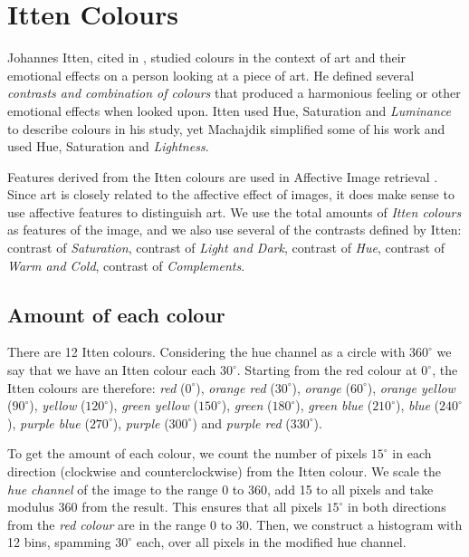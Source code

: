 \documentclass[11pt,a4paper,twoside,openright]{report}
\begin{document}
\section{Itten Colours}

Johannes Itten, cited in \cite{mach10clas}, studied colours in the context of
art and their emotional effects on a person looking at a piece of art.  He
defined several \emph{contrasts and combination of colours} that produced a
harmonious feeling or other emotional effects when looked upon.  Itten used
Hue, Saturation and \emph{Luminance} to describe colours in his study, yet
Machajdik \cite{mach10clas} simplified some of his work and used Hue,
Saturation and \emph{Lightness}.

Features derived from the Itten colours are used in Affective Image retrieval
\cite{mach10clas}.  Since art is closely related to the affective effect of
images, it does make sense to use affective features to distinguish art.  We
use the total amounts of \emph{Itten colours} as features of the image, and we
also use several of the contrasts defined by Itten: contrast of
\emph{Saturation}, contrast of \emph{Light and Dark}, contrast of \emph{Hue},
contrast of \emph{Warm and Cold}, contrast of \emph{Complements}.

\subsection{Amount of each colour}

There are 12 Itten colours.  Considering the hue channel as a circle
with $360^{\circ}$ we say that we have an Itten colour each $30^{\circ}$.
Starting from the red colour at $0^{\circ}$, the Itten colours are therefore:
\emph{red}    ($0^{\circ}$),   \emph{orange red}    ($30^{\circ}$),
\emph{orange} ($60^{\circ}$),  \emph{orange yellow} ($90^{\circ}$),
\emph{yellow} ($120^{\circ}$), \emph{green yellow}  ($150^{\circ}$),
\emph{green}  ($180^{\circ}$), \emph{green blue}    ($210^{\circ}$),
\emph{blue}   ($240^{\circ}$), \emph{purple blue}   ($270^{\circ}$),
\emph{purple} ($300^{\circ}$) and \emph{purple red} ($330^{\circ}$).

To get the amount of each colour, we count the number of pixels $15^{\circ}$ in
each direction (clockwise and counterclockwise) from the Itten colour.  We
scale the \emph{hue channel} of the image to the range 0 to 360, add 15 to all
pixels and take modulus 360 from the result.  This ensures that all pixels
$15^{\circ}$ in both directions from the \emph{red colour} are in the range 0
to 30.  Then, we construct a histogram with 12 bins, spamming $30^{\circ}$
each, over all pixels in the modified hue channel.
\end{document}
